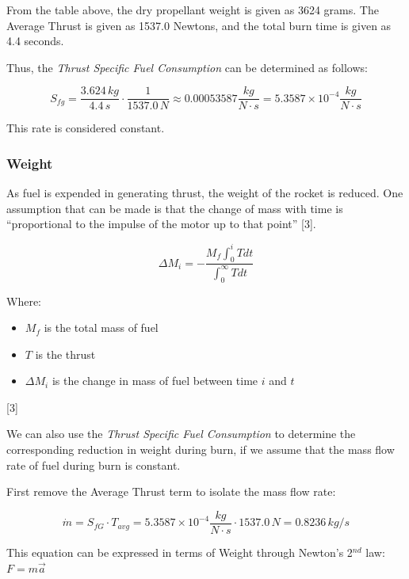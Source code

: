 \documentclass[]{article}
\providecommand{\tightlist}{%
  \setlength{\itemsep}{0pt}\setlength{\parskip}{0pt}}
\begin{document}
From the table above, the dry propellant weight is given as 3624 grams.
The Average Thrust is given as 1537.0 Newtons, and the total burn time
is given as 4.4 seconds.

Thus, the \emph{Thrust Specific Fuel Consumption} can be determined as
follows:

\begin{equation}
S_{fg} = \dfrac{3.624 \, kg}{4.4 \, s} \cdot \dfrac{1}{1537.0 \, N} \approx 0.00053587 \dfrac{kg}{N \cdot s} = 5.3587 \times 10^{-4} \dfrac{kg}{N \cdot s} 
\end{equation}

This rate is considered constant.

\subsubsection{Weight}\label{weight}

As fuel is expended in generating thrust, the weight of the rocket is
reduced. One assumption that can be made is that the change of mass with
time is ``proportional to the impulse of the motor up to that point''
{[}3{]}.

\begin{equation}
\label{eq_mass_burned}
\Delta M_i = - \dfrac{M_f \int^i_0 T dt}{\int^\infty_0 T dt}
\end{equation}

Where:

\begin{itemize}
\tightlist
\item
  \(M_f\) is the total mass of fuel
\item
  \(T\) is the thrust
\item
  \(\Delta M_i\) is the change in mass of fuel between time \(i\) and
  \(t\)
\end{itemize}

{[}3{]}

We can also use the \emph{Thrust Specific Fuel Consumption} to determine
the corresponding reduction in weight during burn, if we assume that the
mass flow rate of fuel during burn is constant.

First remove the Average Thrust term to isolate the mass flow rate:

\begin{equation}
\dot{m} = S_{fG} \cdot T_{avg} = 5.3587 \times 10^{-4} \dfrac{kg}{N \cdot s} \cdot 1537.0 \, N  = 0.8236 \, kg/s 
\end{equation}

This equation can be expressed in terms of Weight through Newton's
2\(^{nd}\) law: \(F = m\vec{a}\)
\end{document}
